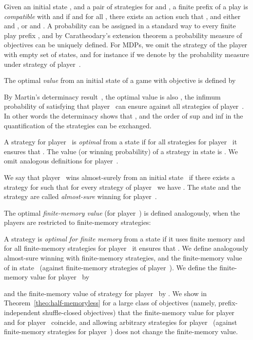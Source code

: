 \documentclass{article}
\begin{document}
\smallskip{}
Given an initial state , and a pair of strategies  for  and ,
a finite prefix  of a play is \emph{compatible}
with  and  if  and for all , there exists an action
 such that , 
and either  and ,
or  and .
A probability can be assigned in a standard way to every finite play prefix , 
and by Caratheodary's extension theorem a probability measure  
of objectives can be uniquely defined.  
For MDPs, we omit the strategy of the player with empty set of states, and 
for instance if  we denote by  
the probability measure under strategy  of player~.


\smallskip{}
The optimal \emph{value} from an initial state  of a game with objective  is defined by

By Martin's determinacy result~\cite{Mar98}, the optimal value is also 
,
the infimum probability of satisfying  that player~ can ensure
against all strategies of player~.
In other words the determinacy shows that , and the order
of sup and inf in the quantification of the strategies can be exchanged.

A strategy  for player~ is \emph{optimal} from a state 
if for all strategies  for player~ it ensures that 
. The value (or winning probability) of
a strategy  in state  is . 
We omit analogous definitions for player~.

We say that player~ wins almost-surely from an initial state~ if there exists a strategy  for  such that for every strategy
 of player~ we have .
The state  and the strategy  are called \emph{almost-sure} winning for player~.

\smallskip{}
The optimal \emph{finite-memory value} (for player~) is defined analogously, 
when the players are restricted to finite-memory strategies:



A strategy  is \emph{optimal for finite memory} from a state 
if it uses finite memory and for all finite-memory strategies  for player~ it ensures that 
.
We define analogously almost-sure winning with finite-memory strategies,
and the finite-memory value  of  in state~
(against finite-memory strategies of player~). 
We define the finite-memory value for player~ by 

and the finite-memory value of strategy  for player~ by 
.
We show in Theorem~\ref{theo:half-memoryless} for a large class of objectives 
(namely, prefix-independent shuffle-closed objectives) that 
the finite-memory value for player~ and for player~ coincide,
and allowing arbitrary strategies for player~ (against finite-memory 
strategies for player~) does not change the finite-memory value.
\end{document}
